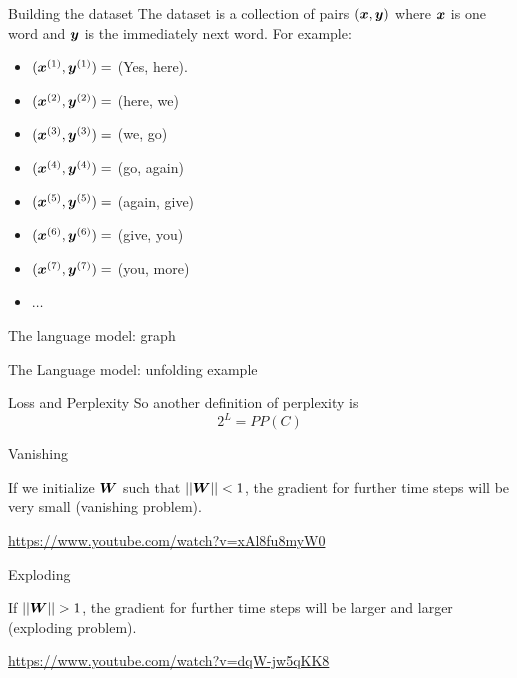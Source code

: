 \documentclass[10pt]{beamer}
\begin{document}
\begin{frame}{Building the dataset}
The dataset is a collection of pairs $(\bm{x},\bm{y})$ where $\bm{x}$ is one word and $\bm{y}$ is the immediately next word. For example:
\begin{itemize}
\item [] $(\bm{x}^{(1)}, \bm{y}^{(1)}) =$ (Yes, here).
\item [] $(\bm{x}^{(2)}, \bm{y}^{(2)}) =$ (here, we)
\item [] $(\bm{x}^{(3)}, \bm{y}^{(3)}) =$ (we, go)
\item [] $(\bm{x}^{(4)}, \bm{y}^{(4)}) =$ (go, again)
\item [] $(\bm{x}^{(5)}, \bm{y}^{(5)}) =$ (again, give)
\item [] $(\bm{x}^{(6)}, \bm{y}^{(6)}) =$ (give, you)
\item [] $(\bm{x}^{(7)}, \bm{y}^{(7)}) =$ (you, more)
\item [] $\dots$
\end{itemize}
\end{frame}


\begin{frame}{The language model: graph}

\end{frame}

\begin{frame}{The Language model: unfolding example}

\end{frame}

\begin{frame}{Loss and Perplexity}
So another definition of perplexity is
\vspace{0.5cm}
\Large{
\begin{equation*}
2^{L} = PP(C)
\end{equation*}
}
\end{frame}


\begin{frame}{Vanishing}

If we initialize $\bm{W}$ such that $||\bm{W}|| < 1$, the gradient for further time steps will be very small (\alert{vanishing problem}).

\vspace{0.8cm}
 \url{https://www.youtube.com/watch?v=xAl8fu8myW0}


\end{frame}

\begin{frame}{Exploding}

If $||\bm{W}|| > 1$, the gradient for further time steps will be larger and larger (\alert{exploding problem}).

\vspace{0.8cm}
 \url{https://www.youtube.com/watch?v=dqW-jw5qKK8}


\end{frame}
\end{document}
